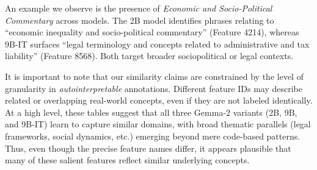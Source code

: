 An example we observe is the presence of \emph{Economic and Socio-Political Commentary} across models. The 2B model identifies phrases relating to “economic inequality and socio-political commentary” (Feature 4214), whereas 9B-IT surfaces “legal terminology and concepts related to administrative and tax liability” (Feature 8568). Both target broader sociopolitical or legal contexts.

It is important to note that our similarity claims are constrained by the level of granularity in \textit{autointerpretable} annotations. Different feature IDs may describe related or overlapping real-world concepts, even if they are not labeled identically. At a high level, these tables suggest that all three Gemma-2 variants (2B, 9B, and 9B-IT) learn to capture similar domains, with broad thematic parallels (legal frameworks, social dynamics, etc.) emerging beyond mere code-based patterns. Thus, even though the precise feature names differ, it appears plausible that many of these salient features reflect similar underlying concepts. 

